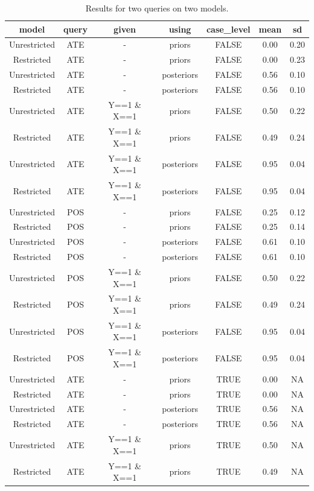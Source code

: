 \documentclass[
  11pt,
  article]{jss}
\begin{document}
\begin{longtable}[t]{ccccccc}

\caption{\label{tbl-batch-query}Results for two queries on two models.}

\tabularnewline

\toprule
model & query & given & using & case\_level & mean & sd\\
\midrule
Unrestricted & ATE & - & priors & FALSE & 0.00 & 0.20\\
Restricted & ATE & - & priors & FALSE & 0.00 & 0.23\\
Unrestricted & ATE & - & posteriors & FALSE & 0.56 & 0.10\\
Restricted & ATE & - & posteriors & FALSE & 0.56 & 0.10\\
Unrestricted & ATE & Y==1 \& X==1 & priors & FALSE & 0.50 & 0.22\\
\addlinespace
Restricted & ATE & Y==1 \& X==1 & priors & FALSE & 0.49 & 0.24\\
Unrestricted & ATE & Y==1 \& X==1 & posteriors & FALSE & 0.95 & 0.04\\
Restricted & ATE & Y==1 \& X==1 & posteriors & FALSE & 0.95 & 0.04\\
Unrestricted & POS & - & priors & FALSE & 0.25 & 0.12\\
Restricted & POS & - & priors & FALSE & 0.25 & 0.14\\
\addlinespace
Unrestricted & POS & - & posteriors & FALSE & 0.61 & 0.10\\
Restricted & POS & - & posteriors & FALSE & 0.61 & 0.10\\
Unrestricted & POS & Y==1 \& X==1 & priors & FALSE & 0.50 & 0.22\\
Restricted & POS & Y==1 \& X==1 & priors & FALSE & 0.49 & 0.24\\
Unrestricted & POS & Y==1 \& X==1 & posteriors & FALSE & 0.95 & 0.04\\
\addlinespace
Restricted & POS & Y==1 \& X==1 & posteriors & FALSE & 0.95 & 0.04\\
Unrestricted & ATE & - & priors & TRUE & 0.00 & NA\\
Restricted & ATE & - & priors & TRUE & 0.00 & NA\\
Unrestricted & ATE & - & posteriors & TRUE & 0.56 & NA\\
Restricted & ATE & - & posteriors & TRUE & 0.56 & NA\\
\addlinespace
Unrestricted & ATE & Y==1 \& X==1 & priors & TRUE & 0.50 & NA\\
Restricted & ATE & Y==1 \& X==1 & priors & TRUE & 0.49 & NA\\

\end{longtable}
\end{document}
